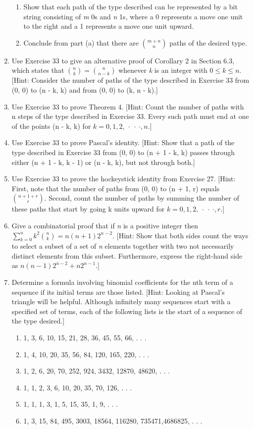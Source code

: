 \documentclass[11pt,a4paper]{book}
\newcommand{\onestaritem}{\refstepcounter{enumi}\item[$*$\theenumi.]}
\begin{document}
\begin{enumerate}
\begin{enumerate}[label=(\alph*)]
\item Show that each path of the type described can be represented by a bit string consisting of \emph{m} 0s and \emph{n} 1s, where a 0 represents a move one unit to the right and a 1 represents a move one unit upward.
\item Conclude from part (a) that there are $\binom{m+n}{n}$ paths of the desired type.
\end{enumerate}
\item Use Exercise 33 to give an alternative proof of Corollary 2 in Section 6.3, which states that $\binom{n}{k} = \binom{n}{n-k}$ whenever \emph{k} is an integer with $0 \leq k \leq n$. [Hint: Consider the number of paths of the type described in Exercise 33 from (0, 0) to (n - k, k) and from (0, 0) to (k, n - k).]
\item Use Exercise 33 to prove Theorem 4. [Hint: Count the number of paths with n steps of the type described in Exercise 33.
Every such path must end at one of the points (n - k, k) for $k = 0, 1, 2,~\cdot~\cdot~\cdot, n.]$
\item Use Exercise 33 to prove Pascal’s identity. [Hint: Show that a path of the type described in Exercise 33 from (0, 0) to (n + 1 - k, k) passes through either (n + 1 - k, k - 1) or (n - k, k), but not through both.]
\item Use Exercise 33 to prove the hockeystick identity from Exercise 27. [Hint: First, note that the number of paths from (0, 0) to (n + 1, r) equals $\binom{n+1+r}{r}$.
Second, count the number of paths by summing the number of these paths that start by going k units upward for $k = 0, 1, 2,~\cdot~\cdot~\cdot, r$.]
\item Give a combinatorial proof that if \emph{n} is a positive integer then $\sum_{k=0}^{n}k^{2}\binom{n}{k} = n(n + 1)2^{n-2}$. [Hint: Show that both sides count the ways to select a subset of a set of \emph{n} elements together with two not necessarily distinct elements from this subset.
Furthermore, express the right-hand side as $n(n - 1)2^{n-2} + n2^{n-1}$.]
\onestaritem Determine a formula involving binomial coefficients for the nth term of a sequence if its initial terms are those listed. [Hint: Looking at Pascal’s triangle will be helpful.
Although infinitely many sequences start with a specified set of terms, each of the following lists is the start of a sequence of the type desired.]
\begin{enumerate}[label=(\alph*)]
\item 1, 3, 6, 10, 15, 21, 28, 36, 45, 55, 66, . . .
\item 1, 4, 10, 20, 35, 56, 84, 120, 165, 220, . . .
\item 1, 2, 6, 20, 70, 252, 924, 3432, 12870, 48620, . . .
\item 1, 1, 2, 3, 6, 10, 20, 35, 70, 126, . . .
\item 1, 1, 1, 3, 1, 5, 15, 35, 1, 9, . . .
\item 1, 3, 15, 84, 495, 3003, 18564, 116280, 735471,4686825, . . .
\end{enumerate}
\end{enumerate}
\end{document}

